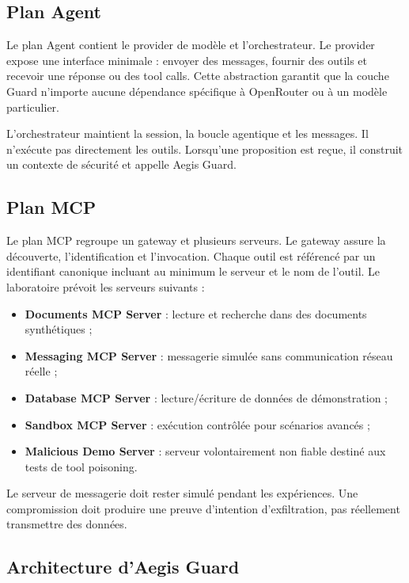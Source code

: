 \subsection{Plan Agent}

Le plan Agent contient le provider de modèle et l'orchestrateur. Le provider expose une interface minimale : envoyer des messages, fournir des outils et recevoir une réponse ou des tool calls. Cette abstraction garantit que la couche Guard n'importe aucune dépendance spécifique à OpenRouter ou à un modèle particulier.

L'orchestrateur maintient la session, la boucle agentique et les messages. Il n'exécute pas directement les outils. Lorsqu'une proposition est reçue, il construit un contexte de sécurité et appelle Aegis Guard.

\subsection{Plan MCP}

Le plan MCP regroupe un gateway et plusieurs serveurs. Le gateway assure la découverte, l'identification et l'invocation. Chaque outil est référencé par un identifiant canonique incluant au minimum le serveur et le nom de l'outil. Le laboratoire prévoit les serveurs suivants :

\begin{itemize}
    \item \textbf{Documents MCP Server} : lecture et recherche dans des documents synthétiques ;
    \item \textbf{Messaging MCP Server} : messagerie simulée sans communication réseau réelle ;
    \item \textbf{Database MCP Server} : lecture/écriture de données de démonstration ;
    \item \textbf{Sandbox MCP Server} : exécution contrôlée pour scénarios avancés ;
    \item \textbf{Malicious Demo Server} : serveur volontairement non fiable destiné aux tests de tool poisoning.
\end{itemize}

Le serveur de messagerie doit rester simulé pendant les expériences. Une compromission doit produire une preuve d'intention d'exfiltration, pas réellement transmettre des données.

\subsection{Architecture d'Aegis Guard}

